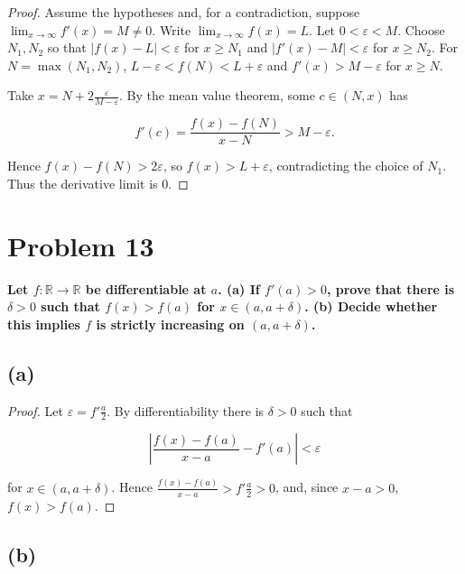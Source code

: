 \begin{proof}

Assume the hypotheses and, for a contradiction, suppose \(\lim_{x\rightarrow\infty}f'(x) = M \neq 0\). Write \(\lim_{x\rightarrow\infty}f(x) = L\). Let \(0 < \varepsilon < M\). Choose \(N_{1},N_{2}\) so that \(\left| {f(x) - L} \right| < \varepsilon\) for \(x \geq N_{1}\) and \(\left| {f'(x) - M} \right| < \varepsilon\) for \(x \geq N_{2}\). For \(N = \max\left( {N_{1},N_{2}} \right)\), \(L - \varepsilon < f(N) < L + \varepsilon\) and \(f'(x) > M - \varepsilon\) for \(x \geq N\).

Take \(x = N + 2\frac{\varepsilon}{M - \varepsilon}\). By the mean value theorem, some \(c \in \left( {N,x} \right)\) has

\[f'(c) = \frac{f(x) - f(N)}{x - N} > M - \varepsilon.\]

Hence \(f(x) - f(N) > 2\varepsilon\), so \(f(x) > L + \varepsilon\), contradicting the choice of \(N_{1}\). Thus the derivative limit is \(0\).

\end{proof}

\section{Problem 13}

\textbf{Let \(f:\mathbb{R}\rightarrow\mathbb{R}\) be differentiable at \(a\). (a) If \(f'(a) > 0\), prove that there is \(\delta > 0\) such that \(f(x) > f(a)\) for \(x \in \left( {a,a + \delta} \right)\). (b) Decide whether this implies \(f\) is strictly increasing on \(\left( {a,a + \delta} \right)\).}

\subsection{(a)}

\begin{proof}

Let \(\varepsilon = f'\frac{a}{2}\). By differentiability there is \(\delta > 0\) such that

\[\left| {\frac{f(x) - f(a)}{x - a} - f'(a)} \right| < \varepsilon\]

for \(x \in \left( {a,a + \delta} \right)\). Hence \(\frac{f(x) - f(a)}{x - a} > f'\frac{a}{2} > 0\), and, since \(x - a > 0\), \(f(x) > f(a)\).

\end{proof}

\subsection{(b)}

